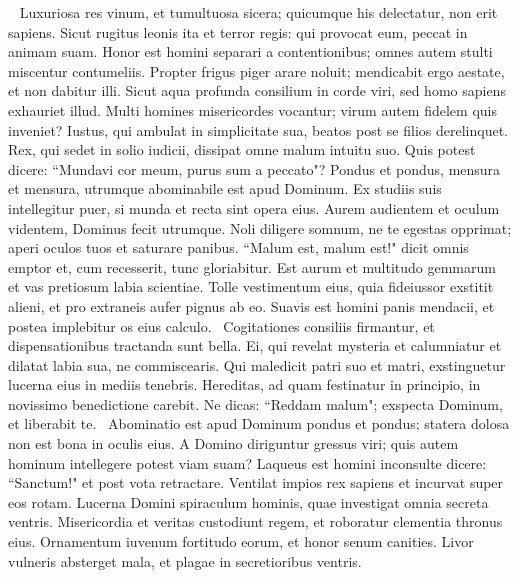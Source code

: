 \begin{biblechapter}   
\verse Luxuriosa res vinum, et tumultuosa sicera; quicumque his delectatur, non erit sapiens. 
\verse Sicut rugitus leonis ita et terror regis: qui provocat eum, peccat in animam suam. 
\verse Honor est homini separari a contentionibus; omnes autem stulti miscentur contumeliis. 
\verse Propter frigus piger arare noluit; mendicabit ergo aestate, et non dabitur illi. 
\verse Sicut aqua profunda consilium in corde viri, sed homo sapiens exhauriet illud. 
\verse Multi homines misericordes vocantur; virum autem fidelem quis inveniet? 
\verse Iustus, qui ambulat in simplicitate sua, beatos post se filios derelinquet. 
\verse Rex, qui sedet in solio iudicii, dissipat omne malum intuitu suo. 
\verse Quis potest dicere: “Mundavi cor meum, purus sum a peccato"? 
\verse Pondus et pondus, mensura et mensura, utrumque abominabile est apud Dominum. 
\verse Ex studiis suis intellegitur puer, si munda et recta sint opera eius. 
\verse Aurem audientem et oculum videntem, Dominus fecit utrumque. 
\verse Noli diligere somnum, ne te egestas opprimat; aperi oculos tuos et saturare panibus. 
\verse “Malum est, malum est!" dicit omnis emptor et, cum recesserit, tunc gloriabitur. 
\verse Est aurum et multitudo gemmarum et vas pretiosum labia scientiae. 
\verse Tolle vestimentum eius, quia fideiussor exstitit alieni, et pro extraneis aufer pignus ab eo. 
\verse Suavis est homini panis mendacii, et postea implebitur os eius calculo.  
\verse Cogitationes consiliis firmantur, et dispensationibus tractanda sunt bella. 
\verse Ei, qui revelat mysteria et calumniatur et dilatat labia sua, ne commiscearis. 
\verse Qui maledicit patri suo et matri, exstinguetur lucerna eius in mediis tenebris. 
\verse Hereditas, ad quam festinatur in principio, in novissimo benedictione carebit. 
\verse Ne dicas: “Reddam malum"; exspecta Dominum, et liberabit te.  
\verse Abominatio est apud Dominum pondus et pondus; statera dolosa non est bona in oculis eius. 
\verse A Domino diriguntur gressus viri; quis autem hominum intellegere potest viam suam? 
\verse Laqueus est homini inconsulte dicere: “Sanctum!" et post vota retractare. 
\verse Ventilat impios rex sapiens et incurvat super eos rotam. 
\verse Lucerna Domini spiraculum hominis, quae investigat omnia secreta ventris. 
\verse Misericordia et veritas custodiunt regem, et roboratur clementia thronus eius. 
\verse Ornamentum iuvenum fortitudo eorum, et honor senum canities. 
\verse Livor vulneris absterget mala, et plagae in secretioribus ventris. 
\end{biblechapter}

